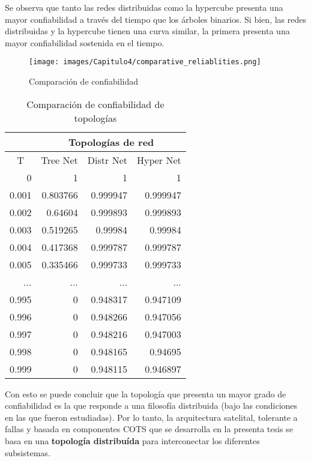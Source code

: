 Se observa que tanto las redes distribuidas como la hypercube presenta una mayor confiabilidad a través del tiempo que  los árboles binarios. Si bien, las redes distribuidas y la hypercube tienen una curva similar, la primera presenta una mayor confiabilidad sostenida en el tiempo.

\begin{figure}[H]
 \centering
 \texttt{[image: images/Capitulo4/comparative\_reliablities.png]}
  \caption{Comparación de confiabilidad}
\label{fig:comparative_reliablities}
\end{figure}

\begin{table}[H]
\centering
\caption{Comparación de confiabilidad de topologías}
\label{table_comprative_reliability}
\begin{tabular}{r|r|r|r|}
\cline{2-4}
\multicolumn{1}{l|}{} & \multicolumn{3}{c|}{Topologías de red} \\ \hline
\multicolumn{1}{|c|}{T} & \multicolumn{1}{c|}{Tree Net} & \multicolumn{1}{c|}{Distr Net} & \multicolumn{1}{c|}{Hyper Net} \\ \hline
\multicolumn{1}{|r|}{0} & 1 & 1 & 1 \\ \hline
\multicolumn{1}{|r|}{0.001} & 0.803766 & 0.999947 & 0.999947 \\ \hline
\multicolumn{1}{|r|}{0.002} & 0.64604 & 0.999893 & 0.999893 \\ \hline
\multicolumn{1}{|r|}{0.003} & 0.519265 & 0.99984 & 0.99984 \\ \hline
\multicolumn{1}{|r|}{0.004} & 0.417368 & 0.999787 & 0.999787 \\ \hline
\multicolumn{1}{|r|}{0.005} & 0.335466 & 0.999733 & 0.999733 \\ \hline
\multicolumn{1}{|r|}{...} & ... & ... & ... \\ \hline
\multicolumn{1}{|r|}{0.995} & 0 & 0.948317 & 0.947109 \\ \hline
\multicolumn{1}{|r|}{0.996} & 0 & 0.948266 & 0.947056 \\ \hline
\multicolumn{1}{|r|}{0.997} & 0 & 0.948216 & 0.947003 \\ \hline
\multicolumn{1}{|r|}{0.998} & 0 & 0.948165 & 0.94695 \\ \hline
\multicolumn{1}{|r|}{0.999} & 0 & 0.948115 & 0.946897 \\ \hline
\end{tabular}
\end{table}


Con esto se puede concluir que la topología que presenta un mayor grado de confiabilidad es la que responde a una filosofía distribuida (bajo las condiciones en las que fueron estudiadas). Por lo tanto, la arquitectura satelital, tolerante a fallas y basada en componentes COTS que se desarrolla en la presenta tesis se basa en una \textbf{topología distribuída} para interconectar los diferentes subsistemas.

